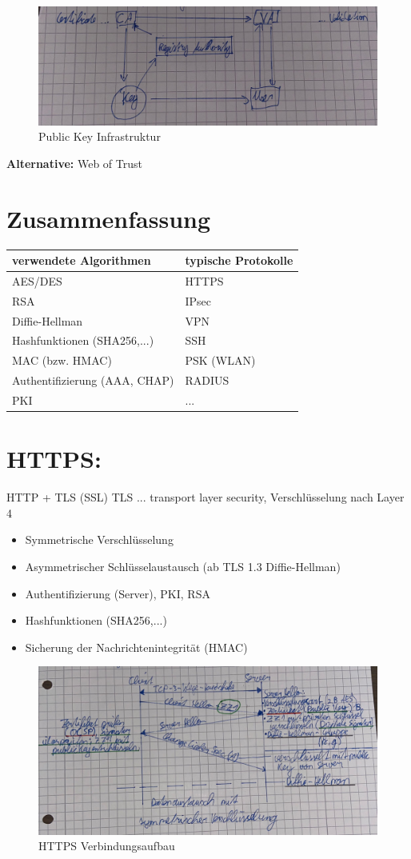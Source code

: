 \begin{figure}[H]
	\centering
	\includegraphics[width=0.7\linewidth]{figures/cert.jpeg}
	\caption{Public Key Infrastruktur}
\end{figure}

\textbf{Alternative:} Web of Trust \\

\section{Zusammenfassung}
\begin{tabular}{ | p{} | p{} |} \hline
	\textbf{verwendete Algorithmen} & \textbf{typische Protokolle} \\ \hline
	AES/DES & HTTPS \\
	RSA & IPsec \\
	Diffie-Hellman & VPN \\
	Hashfunktionen (SHA256,...) & SSH \\
	MAC (bzw. HMAC) & PSK (WLAN) \\
	Authentifizierung (AAA, CHAP) & RADIUS \\
	PKI & ... \\
	\hline
\end{tabular} 

\section{HTTPS:} HTTP + TLS (SSL)
TLS ... transport layer security, Verschlüsselung nach Layer 4
\begin{itemize}
	\item Symmetrische Verschlüsselung
	\item Asymmetrischer Schlüsselaustausch (ab TLS 1.3 Diffie-Hellman)
	\item Authentifizierung (Server), PKI, RSA
	\item Hashfunktionen (SHA256,...)
	\item Sicherung der Nachrichtenintegrität (HMAC)
\end{itemize}

\begin{figure}[H]
	\centering
	\includegraphics[width=1.0\linewidth]{figures/https.jpeg}
	\caption{HTTPS Verbindungsaufbau}
\end{figure}









